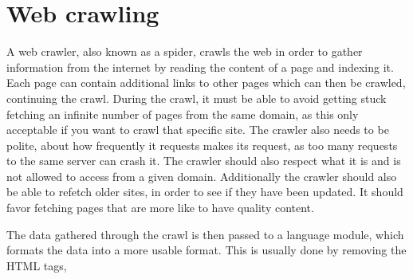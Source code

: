 \section{Web crawling}


\citep[Ch.20]{manning2008introduction}


A web crawler, also known as a spider, crawls the web in order to gather
information from the internet by reading the content of a page and indexing it.
Each page can contain additional links to other pages which can then be
crawled, continuing the crawl. During the crawl, it must be able to avoid
getting stuck fetching an infinite number of pages from the same domain, as this only
acceptable if you want to crawl that specific site. The crawler also needs to
be polite, about how frequently it requests makes its request, as too many
requests to the same server can crash it. The crawler should also respect
what it is and is not allowed to access from a given domain.
Additionally the crawler should also be able to refetch older sites, in order to
see if they have been updated. It should favor fetching pages that are more
like to have quality content.\nl


The data gathered through the crawl is then passed to a language module, which
formats the data into a more usable format. This is usually done by removing
the HTML tags, 




